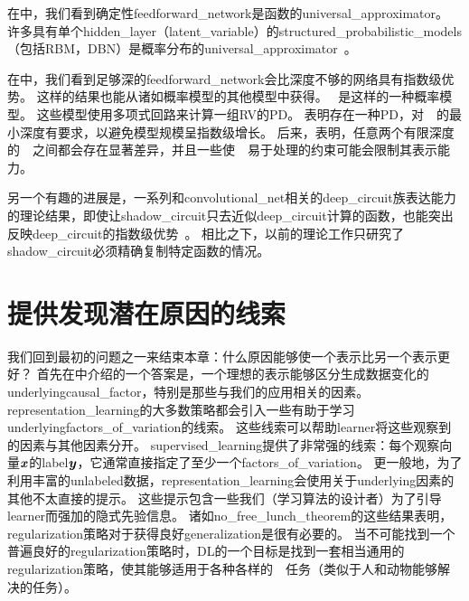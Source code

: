 

在中，我们看到确定性\gls{feedforward_network}是函数的\gls{universal_approximator}。
许多具有单个\gls{hidden_layer}（\gls{latent_variable}）的\gls{structured_probabilistic_models}（包括\gls{RBM}，\gls{DBN}）是概率分布的\gls{universal_approximator}~\citep{LeRoux-Bengio-2008,LeRoux+Bengio-2010,Montufar-2011,Montufar-arxiv2013,Krause-et-al-ICML2013}。


在中，我们看到足够深的\gls{feedforward_network}会比深度不够的网络具有指数级优势。
这样的结果也能从诸如概率模型的其他模型中获得。
~\citep{Poon+Domingos-2011}是这样的一种概率模型。
这些模型使用多项式回路来计算一组\gls{RV}的\gls{PD}。
\cite{Delalleau+Bengio-2011-small}表明存在一种\gls{PD}，对~~的最小深度有要求，以避免模型规模呈指数级增长。
后来，\cite{Martens+Medabalimi-arxiv2014}表明，任意两个有限深度的~~之间都会存在显著差异，并且一些使~~易于处理的约束可能会限制其表示能力。


另一个有趣的进展是，一系列和\gls{convolutional_net}相关的\gls{deep_circuit}族表达能力的理论结果，即使让\gls{shadow_circuit}只去近似\gls{deep_circuit}计算的函数，也能突出反映\gls{deep_circuit}的指数级优势~\citep{Cohen-et-al-arXiv2015}。
相比之下，以前的理论工作只研究了\gls{shadow_circuit}必须精确复制特定函数的情况。


\section{提供发现潜在原因的线索}
\label{sec:providing_clues_to_discover_underlying_causes}


我们回到最初的问题之一来结束本章：什么原因能够使一个表示比另一个表示更好？
首先在中介绍的一个答案是，一个理想的表示能够区分生成数据变化的\gls{underlying}\gls{causal_factor}，特别是那些与我们的应用相关的因素。
\gls{representation_learning}的大多数策略都会引入一些有助于学习\gls{underlying}\gls{factors_of_variation}的线索。
这些线索可以帮助\gls{learner}将这些观察到的因素与其他因素分开。
\gls{supervised_learning}提供了非常强的线索：每个观察向量$\boldsymbol{\mathit{x}}$的\gls{label}$\boldsymbol{\mathit{y}}$，它通常直接指定了至少一个\gls{factors_of_variation}。
更一般地，为了利用丰富的\gls{unlabeled}数据，\gls{representation_learning}会使用关于\gls{underlying}因素的其他不太直接的提示。
这些提示包含一些我们（学习算法的设计者）为了引导\gls{learner}而强加的隐式先验信息。
诸如\gls{no_free_lunch_theorem}的这些结果表明，\gls{regularization}策略对于获得良好\gls{generalization}是很有必要的。
当不可能找到一个普遍良好的\gls{regularization}策略时，\gls{DL}的一个目标是找到一套相当通用的\gls{regularization}策略，使其能够适用于各种各样的~~任务（类似于人和动物能够解决的任务）。

